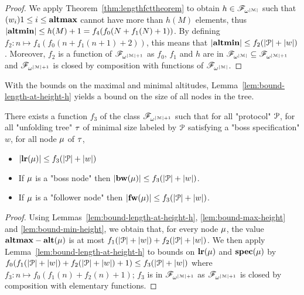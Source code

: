 \begin{proof}
	We apply Theorem~\ref{thm:lengthfcttheorem} to obtain $h \in \mathscr{F}_{\omega^{|\mathcal{M}|}}$ such that $(w_i){1\leq i \leq \mathbf{altmax}}$ cannot have more than $h(M)$ elements, thus $|\mathbf{altmin}| \leq h(M)+1 = f_4(f_0(N+f_1(N)+1))$. By defining $f_2: n \mapsto f_4(f_0(n+f_1(n+1)+2))$, this means that $|\mathbf{altmin}| \leq f_2(|\mathcal{P}| + |w|)$. Moreover, $f_2$ is a function of $\mathscr{F}_{\omega^{|\mathcal{M}|+1}}$ as $f_0$, $f_1$ and $h$ are in $\mathscr{F}_{\omega^{|\mathcal{M}|}} \subseteq \mathscr{F}_{\omega^{|\mathcal{M}|+1}}$ and $\mathscr{F}_{\omega^{|\mathcal{M}|+1}}$ is closed by composition with functions of $\mathscr{F}_{\omega^{|\mathcal{M}|}}$.
\end{proof}

With the bounds on the maximal and minimal altitudes, Lemma~\ref{lem:bound-length-at-height-h} yields a bound on the size of all nodes in the tree.


\begin{lemma}
	\label{lem:bound-node-size}
	There exists a function $f_3$ of the class $\mathscr{F}_{\omega^{|\mathcal{M}|+1}}$ such that for all "protocol" $\mathcal{P}$, for all "unfolding tree" $\tau$ of minimal size labeled by $\mathcal{P}$ satisfying a "boss specification" $w$, for all node $\mu$ of $\tau$,
	
		\begin{itemize}
		\item $|\mathbf{lr}(\mu)| \leq f_3(|\mathcal{P}|+ |w|)$
			
		\item If $\mu$ is a "boss node" then $|\mathbf{bw}(\mu)| \leq f_3(|\mathcal{P}|+ |w|)$.
		
		\item If $\mu$ is a "follower node" then $|\mathbf{fw}(\mu)| \leq f_3(|\mathcal{P}|+ |w|)$.
	\end{itemize} 
\end{lemma}
\begin{proof}
	Using Lemmas~\ref{lem:bound-length-at-height-h}, \ref{lem:bound-max-height} and \ref{lem:bound-min-height}, we obtain that, for every node $\mu$, the value $\mathbf{altmax} - \mathbf{alt}(\mu)$ is at most $f_1(|\mathcal{P}| + |w|) + f_2(|\mathcal{P}| + |w|)$. We then apply Lemma~\ref{lem:bound-length-at-height-h} to bounds on $\mathbf{lr}(\mu)$ and $\mathbf{spec}(\mu)$ by $f_0(f_1(|\mathcal{P}| + |w|) + f_2(|\mathcal{P}| + |w|)+1) \leq f_3(|\mathcal{P}| + |w|)$ where $f_3: n \mapsto f_0(f_1(n) + f_2(n)+1)$; $f_3$ is in $\mathscr{F}_{\omega^{|\mathcal{M}|+1}}$ as $\mathscr{F}_{\omega^{|\mathcal{M}|+1}}$ is closed by composition with elementary functions. 
\end{proof}

